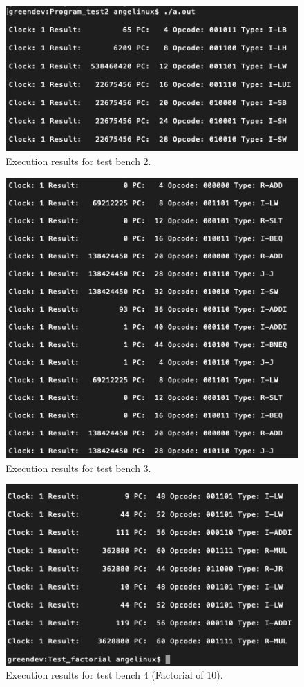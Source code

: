 \documentclass[conference]{IEEEtran}
\begin{document}
\begin{figure}[h]
\includegraphics[scale=0.55]{test_bench_2.png}
\caption{Execution results for test bench 2.}
\label{result_factorial}
\end{figure}

\begin{figure}[h]
\includegraphics[scale=0.5]{test_bench_3.png}
\caption{Execution results for test bench 3.}
\label{result2}
\end{figure}

\begin{figure}[h]
\includegraphics[scale=0.5]{test_bench_4_factorial.png}
\caption{Execution results for test bench 4 (Factorial of 10).}
\label{result3}
\end{figure}
\end{document}
